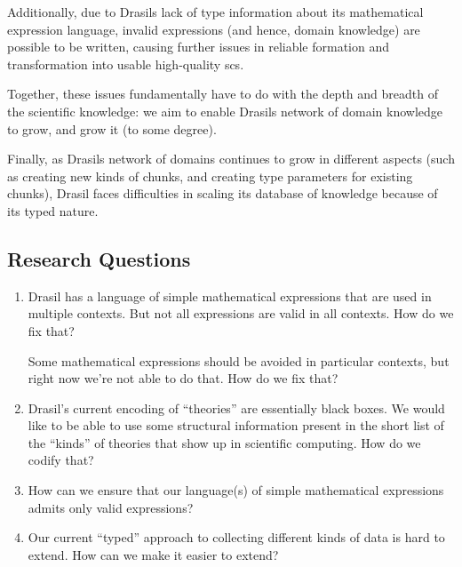 Additionally, due to Drasils lack of type information about its mathematical
expression language, invalid expressions (and hence, domain knowledge) are
possible to be written, causing further issues in reliable formation and
transformation into usable high-quality \acs{scs}.

Together, these issues fundamentally have to do with the depth and breadth of
the scientific knowledge: we aim to enable Drasils network of domain knowledge
to grow, and grow it (to some degree).

Finally, as Drasils network of domains continues to grow in different aspects
(such as creating new kinds of chunks, and creating type parameters for existing
chunks), Drasil faces difficulties in scaling its database of knowledge because
of its typed nature.

\subsection{Research Questions}
\label{sec:intro:researchquestions}


\begin{enumerate}

      \item[\namedlabel{rq:lang_division}{RQ1}] Drasil has a language of simple
            mathematical expressions that are used in multiple contexts. But not
            all expressions are valid in all contexts. How do we fix that?

            Some mathematical expressions should be avoided in particular
            contexts, but right now we're not able to do that. How do we fix
            that?

      \item[\namedlabel{rq:modelkinds}{RQ2}] Drasil's current encoding of
            ``theories'' are essentially black boxes. We would like to be able
            to use some structural information present in the short list of the
            ``kinds'' of theories that show up in scientific computing. How do
            we codify that?

      \item[\namedlabel{rq:typing}{RQ3}] How can we ensure that our language(s)
            of simple mathematical expressions admits only valid expressions?

      \item[\namedlabel{rq:chunkdb}{RQ4}] Our current ``typed'' approach to
            collecting different kinds of data is hard to extend. How can we
            make it easier to extend?

\end{enumerate}

